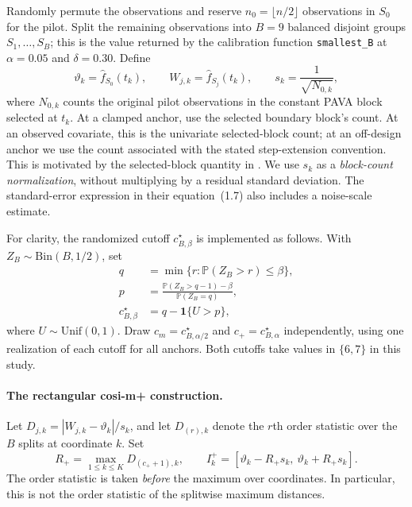 \documentclass[10pt]{article}
\begin{document}
Randomly permute the observations and reserve $n_0=\lfloor n/2\rfloor$ observations in $S_0$ for the pilot. Split the remaining observations into $B=9$ balanced disjoint groups $S_1,\ldots,S_B$; this is the value returned by the calibration function \texttt{smallest\_B} at $\alpha=0.05$ and $\delta=0.30$. Define
\[
 \vartheta_k=\widehat f_{S_0}(t_k),\qquad
 W_{j,k}=\widehat f_{S_j}(t_k),\qquad
 s_k=\frac1{\sqrt{N_{0,k}}},
\]
where $N_{0,k}$ counts the original pilot observations in the constant PAVA block selected at $t_k$. At a clamped anchor, use the selected boundary block's count. At an observed covariate, this is the univariate selected-block count; at an off-design anchor we use the count associated with the stated step-extension convention. This is motivated by the selected-block quantity in \cite[Section~1.1, equations~(1.4) and~(1.6)]{deng2021confidence}. We use $s_k$ as a \emph{block-count normalization}, without multiplying by a residual standard deviation. The standard-error expression in their equation~(1.7) also includes a noise-scale estimate.

For clarity, the randomized cutoff $c^\star_{B,\beta}$ is implemented as follows. With $Z_B\sim\mathrm{Bin}(B,1/2)$, set
\[
 \begin{aligned}
 q&=\min\{r:\mathbb P(Z_B>r)\le\beta\},\\
 p&=\frac{\mathbb P(Z_B>q-1)-\beta}{\mathbb P(Z_B=q)},\\
 c^\star_{B,\beta}&=q-\mathbf1\{U>p\},
 \end{aligned}
\]
where $U\sim\mathrm{Unif}(0,1)$. Draw
$c_m=c^\star_{B,\alpha/2}$ and $c_+=c^\star_{B,\alpha}$ independently, using one realization of each cutoff for all anchors. Both cutoffs take values in $\{6,7\}$ in this study.

\paragraph{The rectangular cosi-m+ construction.}
Let $D_{j,k}=|W_{j,k}-\vartheta_k|/s_k$, and let $D_{(r),k}$ denote the $r$th order statistic over the $B$ splits at coordinate $k$. Set
\[
 R_+=\max_{1\le k\le K}D_{(c_++1),k},\qquad
 I^+_k=[\vartheta_k-R_+s_k,\ \vartheta_k+R_+s_k].
\]
The order statistic is taken \emph{before} the maximum over coordinates. In particular, this is not the order statistic of the splitwise maximum distances.
\end{document}
